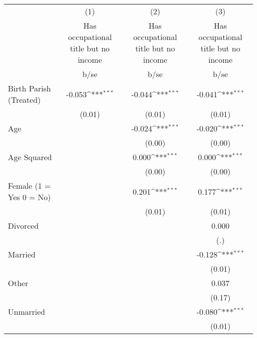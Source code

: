 {
\def\sym#1{\ifmmode^{#1}\else\(^{#1}\)\fi}
\begin{tabular}{l*{3}{c}}
\hline\hline
                    &\multicolumn{1}{c}{(1)}&\multicolumn{1}{c}{(2)}&\multicolumn{1}{c}{(3)}\\
                    &\multicolumn{1}{c}{Has occupational title but no income}&\multicolumn{1}{c}{Has occupational title but no income}&\multicolumn{1}{c}{Has occupational title but no income}\\
                    &        b/se         &        b/se         &        b/se         \\
\hline
Birth Parish (Treated)&      -0.053\sym{***}&      -0.044\sym{***}&      -0.041\sym{***}\\
                    &      (0.01)         &      (0.01)         &      (0.01)         \\
Age                 &                     &      -0.024\sym{***}&      -0.020\sym{***}\\
                    &                     &      (0.00)         &      (0.00)         \\
Age Squared         &                     &       0.000\sym{***}&       0.000\sym{***}\\
                    &                     &      (0.00)         &      (0.00)         \\
Female (1 = Yes 0 = No)&                     &       0.201\sym{***}&       0.177\sym{***}\\
                    &                     &      (0.01)         &      (0.01)         \\
Divorced            &                     &                     &       0.000         \\
                    &                     &                     &         (.)         \\
Married             &                     &                     &      -0.128\sym{***}\\
                    &                     &                     &      (0.01)         \\
Other               &                     &                     &       0.037         \\
                    &                     &                     &      (0.17)         \\
Unmarried           &                     &                     &      -0.080\sym{***}\\
                    &                     &                     &      (0.01)         \\

\end{tabular}}
